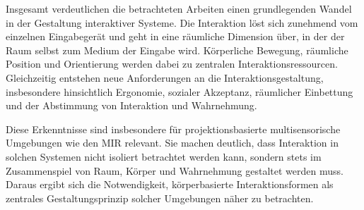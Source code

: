 

Insgesamt verdeutlichen die betrachteten Arbeiten einen grundlegenden Wandel in der Gestaltung interaktiver Systeme. Die Interaktion löst sich zunehmend vom einzelnen Eingabegerät und geht in eine räumliche Dimension über, in der der Raum selbst zum Medium der Eingabe wird. Körperliche Bewegung, räumliche Position und Orientierung werden dabei zu zentralen Interaktionsressourcen. Gleichzeitig entstehen neue Anforderungen an die Interaktionsgestaltung, insbesondere hinsichtlich Ergonomie, sozialer Akzeptanz, räum\-licher Einbettung und der Abstimmung von Interaktion und Wahrnehmung.

Diese Erkenntnisse sind insbesondere für projektionsbasierte multisensorische Umgebungen wie den MIR relevant. Sie machen deutlich, dass Interaktion in solchen Systemen nicht isoliert betrachtet werden kann, sondern stets im Zusammenspiel von Raum, Körper und Wahrnehmung gestaltet werden muss. Daraus ergibt sich die Notwendigkeit, körper\-basierte Interaktionsformen als zentrales Gestaltungsprinzip solcher Umgebungen näher zu betrachten.


